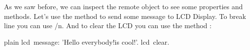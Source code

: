 \documentclass[10pt,twoside,english]{_support/latex/sbabook/sbabook}
\begin{document}
As we saw before, we can inspect the remote object to see some properties and methods. Let's use the method  to send some message to LCD Display. To break line you can use /n. And to clear the LCD you can use the method :

\begin{displaycode}{plain}
lcd message: 'Hello everybody!\Pharo is cool!'. 
lcd clear.
\end{displaycode}


\backmatter

\end{document}
